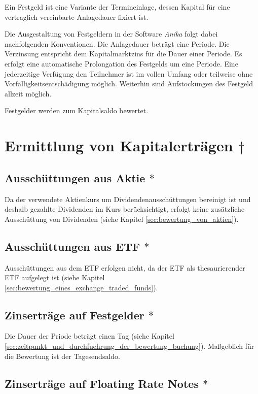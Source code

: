 \documentclass[12pt, a4paper]{article}
\begin{document}
Ein Festgeld ist eine Variante der Termineinlage, dessen Kapital für eine vertraglich vereinbarte Anlagedauer fixiert ist.

Die Ausgestaltung von Festgeldern in der Software \textit{Anika} folgt dabei nachfolgenden Konventionen. Die Anlagedauer beträgt eine Periode.
Die Verzinsung entspricht dem Kapitalmarktzins für die Dauer einer Periode. Es erfolgt eine automatische Prolongation des Festgelds um eine Periode. Eine jederzeitige Verfügung den Teilnehmer ist im vollen Umfang oder teilweise ohne Vorfälligkeitsentschädigung möglich.
Weiterhin sind Aufstockungen des Festgeld allzeit möglich.

Festgelder werden zum Kapitalsaldo bewertet. 

\section{Ermittlung von Kapitalerträgen $\dagger$}
\label{sec:ermittlung_von_wertpapierertraegen}

\subsection{Ausschüttungen aus Aktie $\ast$}
\label{sec:ausschuettung_aus_aktie}
Da der verwendete Aktienkurs um Dividendenausschüttungen bereinigt ist und deshalb gezahlte Dividenden im Kurs berücksichtigt, erfolgt keine zusätzliche Ausschüttung von Dividenden (siehe Kapitel \ref{sec:bewertung_von_aktien}).

\subsection{Ausschüttungen aus \gls{ETF} $\ast$}
\label{sec:ausschuettungen_aus_etf}
Ausschüttungen aus dem \gls{ETF} erfolgen nicht, da der \gls{ETF} als thesaurierender \gls{ETF} aufgelegt ist (siehe Kapitel \ref{sec:bewertung_eines_exchange_traded_funds}).

\subsection{Zinserträge auf Festgelder $\ast$}
\label{sec:zinsertraege_auf_festgelder}
Die Dauer der Priode beträgt einen Tag (siehe Kapitel \ref{sec:zeitpunkt_und_durchfuehrung_der_bewertung_buchung}).
Maßgeblich für die Bewertung ist der Tagesendsaldo.

\subsection{Zinserträge auf Floating Rate Notes $\ast$}
\label{sec:zinsertraege_auf_floating_rate_notes}

\printbibliography[title={Literatur}]
\end{document}
